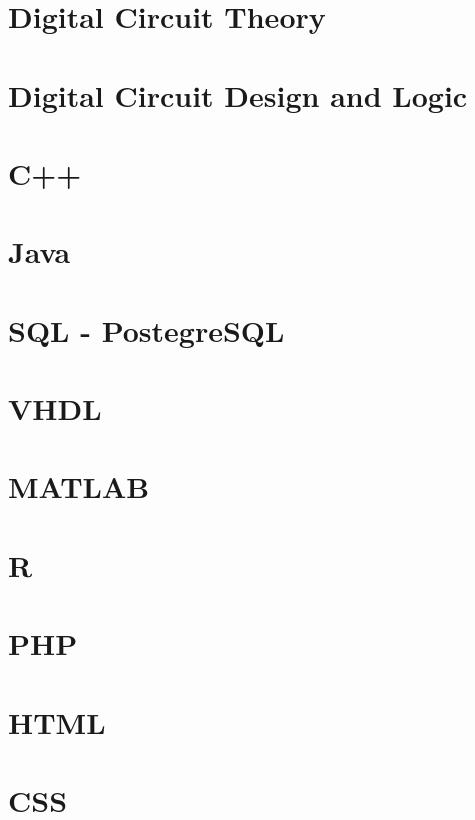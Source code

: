 \documentclass[12pt, letterpaper]{memoir}
\begin{document}
%


\part{Digital Circuit Theory}

%

\part{Digital Circuit Design and Logic}

%


\part{C++}

\part{Java}

\part{SQL - PostegreSQL}

\part{VHDL}

\part{MATLAB}

\part{R}

\part{PHP}

\part{HTML}

\part{CSS}
\end{document}
